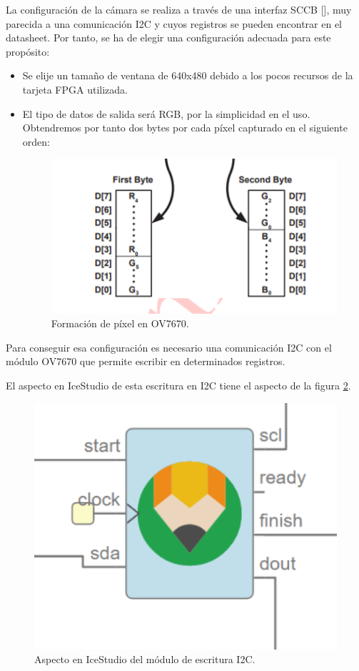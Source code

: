 La configuración de la cámara se realiza a través de una interfaz SCCB [], muy parecida a una comunicación I2C y cuyos registros se pueden encontrar en el datasheet. Por tanto, se ha de elegir una configuración adecuada para este propósito:

\begin{itemize}
	\item Se elije un tamaño de ventana de 640x480 debido a los pocos recursos de la tarjeta FPGA utilizada.
	\item El tipo de datos de salida será RGB, por la simplicidad en el uso. Obtendremos por tanto dos bytes por cada píxel capturado en el siguiente orden: 
	
		\begin{figure}[H]
			\center
			\includegraphics[trim = 0mm 0.5cm 0mm 0.5cm, clip,scale=0.6]{imagenes/Cuadricoptero_vision/pixel_OV7670}
			\caption{Formación de píxel en OV7670.}
			\label{fig:pixel_OV7670}
		\end{figure}
	
\end{itemize}

Para conseguir esa configuración es necesario una comunicación I2C con el módulo OV7670 que permite escribir en determinados registros.

El aspecto en IceStudio de esta escritura en I2C tiene el aspecto de la figura \ref{fig:I2C_write}.
\begin{figure}[H]
	\center
	\includegraphics[scale=0.4, angle=0]{imagenes/Cuadricoptero_vision/I2C_write.PNG}
	\caption{Aspecto en IceStudio del módulo de escritura I2C.}
	\label{fig:I2C_write}
\end{figure}

